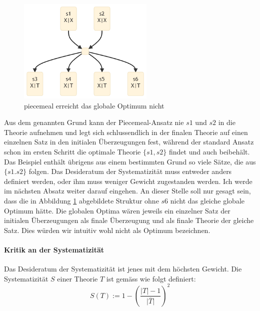\documentclass{article}
\begin{document}
\begin{figure}[ht]
  \centering
  \includegraphics[width=\textwidth,height=5cm,keepaspectratio]{images/standard_better.png}
  \caption{piecemeal erreicht das globale Optimum nicht\label{fig:standard_better}}
\end{figure}

Aus dem genannten Grund kann der Piecemeal-Ansatz nie $s1$ und $s2$ in die Theorie aufnehmen und legt sich schlussendlich in der finalen Theorie auf einen einzelnen Satz in den initialen Überzeugungen fest, während der standard Ansatz schon im ersten Schritt die optimale Theorie $\{s1, s2\}$ findet und auch beibehält. Das Beispiel enthält übrigens aus einem bestimmten Grund so viele Sätze, die aus $\{s1. s2\}$ folgen. Das Desideratum der Systematizität muss entweder anders definiert werden, oder ihm muss weniger Gewicht zugestanden werden. Ich werde im nächsten Absatz weiter darauf eingehen. An dieser Stelle soll nur gesagt sein, dass die in Abbildung \ref{fig:standard_better} abgebildete Struktur ohne $s6$ nicht das gleiche globale Optimum hätte. Die globalen Optima wären jeweils ein einzelner Satz der initialen Überzeugungen als finale Überzeugung und als finale Theorie der gleiche Satz. Dies würden wir intuitiv wohl nicht als Optimum bezeichnen.

\paragraph{Kritik an der Systematizität}
Das Desideratum der Systematizität ist jenes mit dem höchsten Gewicht. Die Systematizität $S$ einer Theorie $T$ ist gemäss \autocite[S. 465]{beisbart_making_2021} wie folgt definiert:
$$
S(T) := 1- \left(\frac{\lvert T \rvert -1}{\lvert \overline{T} \rvert}\right)^2
$$
\end{document}
